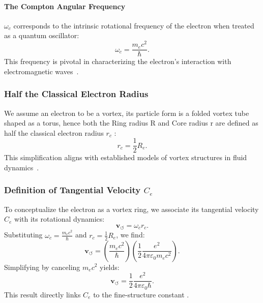 \paragraph*{The Compton Angular Frequency}
 $\omega_c$ corresponds to the intrinsic rotational frequency of the electron when treated as a quantum oscillator:
\begin{equation*}
    \omega_c = \frac{m_e c^2}{\hbar}.
\end{equation*}
This frequency is pivotal in characterizing the electron's interaction with electromagnetic waves~\cite{kelvin1867}.

\subsubsection*{Half the Classical Electron Radius}
We assume an electron to be a vortex, its particle form is a folded vortex tube shaped as a torus, hence both the Ring radius R and Core radius r are defined as half the classical electron radius  $r_c$ :
\begin{equation*}
    r_c = \frac{1}{2} R_e.
\end{equation*}
This simplification aligns with established models of vortex structures in fluid dynamics~\cite{kleckner2013}.

\subsubsection*{Definition of Tangential Velocity $C_e$}
To conceptualize the electron as a vortex ring, we associate its tangential velocity $C_e$ with its rotational dynamics:
\begin{equation*}
    \mathbf{v}_{\scriptscriptstyle\boldsymbol{\circlearrowleft}} = \omega_c r_c.
\end{equation*}
Substituting $\omega_c = \frac{m_e c^2}{\hbar}$ and $r_c = \frac{1}{2} R_e$, we find:
\begin{equation*}
    \mathbf{v}_{\scriptscriptstyle\boldsymbol{\circlearrowleft}} = \left( \frac{m_e c^2}{\hbar} \right) \left( \frac{1}{2} \frac{e^2}{4\pi \varepsilon_0 m_e c^2} \right).
\end{equation*}
Simplifying by canceling $m_e c^2$ yields:
\begin{equation*}
    \mathbf{v}_{\scriptscriptstyle\boldsymbol{\circlearrowleft}} = \frac{1}{2} \frac{e^2}{4\pi \varepsilon_0 \hbar}.\label{eq:C_e-from-compton}
\end{equation*}
This result directly links $C_e$ to the fine-structure constant \cite{vinen2024}.


